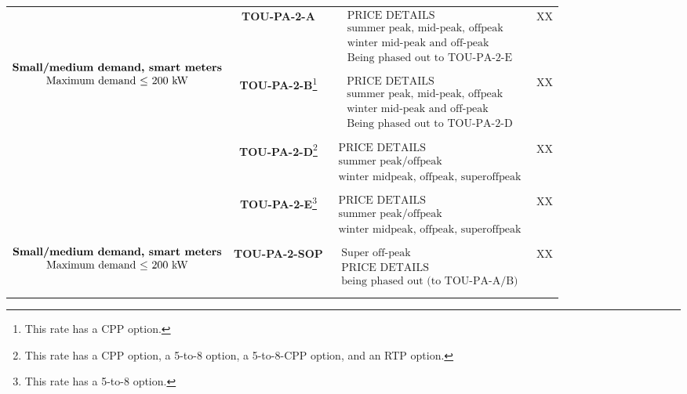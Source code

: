 \documentclass[hidelinks,12pt]{article}
\begin{document}
\begin{table}[b!]
\begin{adjustbox}{center}
\begin{tabular}{|c|c|c|c|}
\multirow{4}{*}{
$ \begin{matrix} \\ \\ \\ \\
\text{\bf Small/medium demand, smart meters} \\
\text{Maximum demand $\leq$ 200 kW} \\
\end{matrix} $ 
} & \textbf{TOU-PA-2-A}& 
\footnotesize $ \begin{matrix}
\text{PRICE DETAILS} \\
\text{summer peak, mid-peak, offpeak}\\
\text{winter mid-peak and off-peak} \\
\text{Being phased out to TOU-PA-2-E} \\
\end{matrix} $ &  XX \\
\cline{2-4}
 & \textbf{TOU-PA-2-B}\footnote{This rate has a CPP option.} &
\footnotesize $ \begin{matrix}
\text{PRICE DETAILS} \\
\text{summer peak, mid-peak, offpeak}\\
\text{winter mid-peak and off-peak} \\
\text{Being phased out to TOU-PA-2-D} \\
\end{matrix} $ &  XX \\
\cline{2-4}
&  \textbf{TOU-PA-2-D}\footnote{This rate has a CPP option, a 5-to-8 option, a 5-to-8-CPP option, and an RTP option.} & 
\footnotesize $ \begin{matrix}
\text{PRICE DETAILS} \\
\text{summer peak/offpeak}\\
\text{winter midpeak, offpeak, superoffpeak} \\
\end{matrix} $ &  XX \\
\cline{2-4}
& \textbf{TOU-PA-2-E}\footnote{This rate has a 5-to-8 option.} & 
\footnotesize $ \begin{matrix}
\text{PRICE DETAILS} \\
\text{summer peak/offpeak}\\
\text{winter midpeak, offpeak, superoffpeak} \\
\end{matrix} $ &  XX \\
\hline
$ \begin{matrix}
\text{\bf Small/medium demand, smart meters} \\
\text{Maximum demand $\leq$ 200 kW} \\
\end{matrix} $ & \textbf{TOU-PA-2-SOP} &
\footnotesize $ \begin{matrix}
\text{Super off-peak} \\
\text{PRICE DETAILS} \\
\text{being phased out (to TOU-PA-A/B)} \\
\end{matrix} $ &  XX \\
\hline


\end{tabular}
\end{adjustbox}
\end{table}
\end{document}

